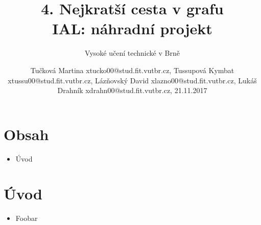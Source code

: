 \documentclass[a4paper,11pt]{article}
\title{4. Nejkratší cesta v grafu\\
{\bf\large IAL: náhradní projekt}}
\author{Vysoké učení technické v Brně}
\date{Tučková Martina xtucko00@stud.fit.vutbr.cz, Tussupová Kymbat xtussu00@stud.fit.vutbr.cz, Lázňovský David xlazno00@stud.fit.vutbr.cz, Lukáš Drahník xdrahn00@stud.fit.vutbr.cz, 21.11.2017}
\begin{document}
{\let\newpage\relax\maketitle}

\newpage

\section*{Obsah}
\begin{itemize}
  \item Úvod
\end{itemize}

\newpage

\section*{Úvod}
\begin{itemize}
  \item Foobar
\end{itemize}

\nocite{*}




\newpage
\thispagestyle{empty}
\end{document}
